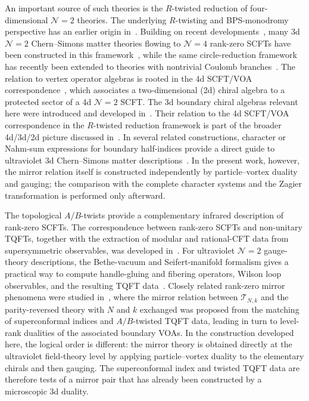 \documentclass[11pt,a4paper]{article}
\numberwithin{equation}{section}
\begin{document}
An important source of such theories is the $R$-twisted reduction of four-dimensional $\mathcal N=2$ theories.  The underlying $R$-twisting and BPS-monodromy perspective has an earlier origin in~\cite{Cecotti:2010fi}.  Building on recent developments~\cite{Gaiotto:2024ioj,ArabiArdehali:2024ysy}, many 3d $\mathcal N=2$ Chern--Simons matter theories flowing to $\mathcal N=4$ rank-zero SCFTs have been constructed in this framework~\cite{ArabiArdehali:2024vli,NishinakaYoshida:2025generalizedAD,Go:2025ixu,Kim:2025rog}, while the same circle-reduction framework has recently been extended to theories with nontrivial Coulomb branches~\cite{Hamachika:2026whv}.  The relation to vertex operator algebras is rooted in the 4d SCFT/VOA correspondence~\cite{Beem:2013sza}, which associates a two-dimensional (2d) chiral algebra to a protected sector of a 4d $\mathcal N=2$ SCFT.  The 3d boundary chiral algebras relevant here were introduced and developed in~\cite{Costello:2018fnz,Costello:2018swh}.  Their relation to the 4d SCFT/VOA correspondence in the $R$-twisted reduction framework is part of the broader 4d/3d/2d picture discussed in~\cite{Dedushenko:2023cvd}.  In several related constructions, character or Nahm-sum expressions for boundary half-indices provide a direct guide to ultraviolet 3d Chern--Simons matter descriptions~\cite{GangKimParkStubbs:2024Nahm,KimSong:2024AD}.  In the present work, however, the mirror relation itself is constructed independently by particle--vortex duality and gauging; the comparison with the complete character systems and the Zagier transformation is performed only afterward.

The topological $A/B$-twists provide a complementary infrared description of rank-zero SCFTs.  The correspondence between rank-zero SCFTs and non-unitary TQFTs, together with the extraction of modular and rational-CFT data from supersymmetric observables, was developed in~\cite{Gang:2021hrd,Gang:2023rei}.  For ultraviolet $\mathcal N=2$ gauge-theory descriptions, the Bethe-vacuum and Seifert-manifold formalism gives a practical way to compute handle-gluing and fibering operators, Wilson loop observables, and the resulting TQFT data~\cite{Closset:2016arn,Closset:2017zgf,ClossetKimWillett:2018Seifert}.  Closely related rank-zero mirror phenomena were studied in~\cite{CreutzigGarnerKim:2024mirror}, where the mirror relation between $\mathcal T_{N,k}$ and the parity-reversed theory with $N$ and $k$ exchanged was proposed from the matching of superconformal indices and $A/B$-twisted TQFT data, leading in turn to level-rank dualities of the associated boundary VOAs.  In the construction developed here, the logical order is different: the mirror theory is obtained directly at the ultraviolet field-theory level by applying particle--vortex duality to the elementary chirals and then gauging.  The superconformal index and twisted TQFT data are therefore tests of a mirror pair that has already been constructed by a microscopic 3d duality.
\end{document}
